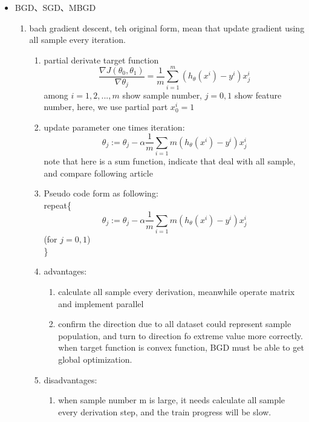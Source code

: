 \documentclass[12pt]{ctexart}%
\begin{document}
\begin{itemize}
			\item BGD、SGD、MBGD
			\begin{enumerate}[(1)]
				\item bach gradient descent, teh original form, mean that update gradient using all sample every iteration.
					\begin{enumerate}
						\item partial derivate target function
								\begin{equation}
									\frac{\nabla J(\theta_0, \theta_1)}{\nabla \theta_j} = \frac{1}{m}\sum_{i=1}^{m}(h_\theta(x^i) - y^i)x_j^i
								\end{equation}
								among $i = 1,2,...,m$ show sample number, $j = 0,1$ show feature number, here, we use partial part $x_0^i = 1$
						\item update parameter one times iteration:
								\begin{equation}
									\theta_j := \theta_j - \alpha\frac{1}{m}\sum_{i=1}{m}(h_\theta(x^i) - y^i)x_j^i
								\end{equation}
								note that here is a sum function, indicate that deal with all sample, and compare following article
						\item Pseudo code form as following:\\
						repeat\{
							$$\theta_j := \theta_j - \alpha\frac{1}{m}\sum_{i=1}{m}(h_\theta(x^i) - y^i)x_j^i$$
							\qquad \qquad \qquad(for $j = 0,1$)\\
						\}
						\item advantages:
						\begin{enumerate}
							\item calculate all sample every derivation, meanwhile operate matrix and implement parallel
							\item confirm the direction due to all dataset could represent sample population, and turn to direction fo extreme value more correctly. when target function is convex function, BGD must be able to get global optimization.
						\end{enumerate}
						\item disadvantages:
						\begin{enumerate}
							\item when sample number m is large, it needs calculate all sample every derivation step, and the train progress will be slow.

\end{enumerate}
\end{enumerate}
\end{enumerate}
\end{itemize}
\end{document}
